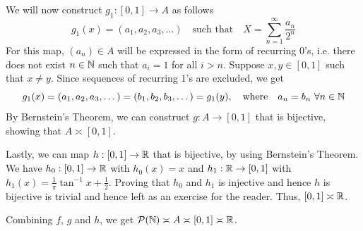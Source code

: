 {{        We will now construct $g_1 : [0,1] \rightarrow A$ as follows
        \[
        g_1 (x) = (a_1, a_2, a_3, \dots) 
        \quad \text{such that} \quad 
        X = \sum_{n=1}^\infty \frac{a_n}{2^n} 
        \]
        For this map, $(a_n) \in A$ will be expressed in the form of recurring $0$’s, i.e. there does not exist $n \in \mathbb N$ such that $a_i = 1$ for all $ i > n $. Suppose $x, y \in [0,1]$ such that $x \ne y$. Since sequences of recurring $1$’s are excluded, we get 
        \[
        g_1(x) = (a_1, a_2, a_3, \dots) = (b_1, b_2, b_3, \dots) = g_1(y), \quad \text{where} \quad a_n = b_n \ \forall n \in \mathbb N
        \]
        By Bernstein’s Theorem, we can construct $g : A \rightarrow [0,1]$ that is bijective, showing that $A \asymp [0,1]$.


        Lastly, we can map $h : [0,1] \rightarrow \mathbb R$ that is bijective, by using Bernstein’s Theorem. We have $h_0 : [0,1] \rightarrow \mathbb R$ with $h_0(x) = x$ and $h_1 : \mathbb R \rightarrow [0,1]$ with $h_1(x) = \frac1\pi \tan^{-1} x + \frac12$. Proving that $h_0$ and $h_1$ is injective and hence $h$ is bijective is trivial and hence left as an exercise for the reader. Thus, $[0,1] \asymp \mathbb R$.

        Combining $f$, $g$ and $h$, we get $\mathcal P(\mathbb N) \asymp A \asymp [0,1] \asymp \mathbb R$.


    }
}

